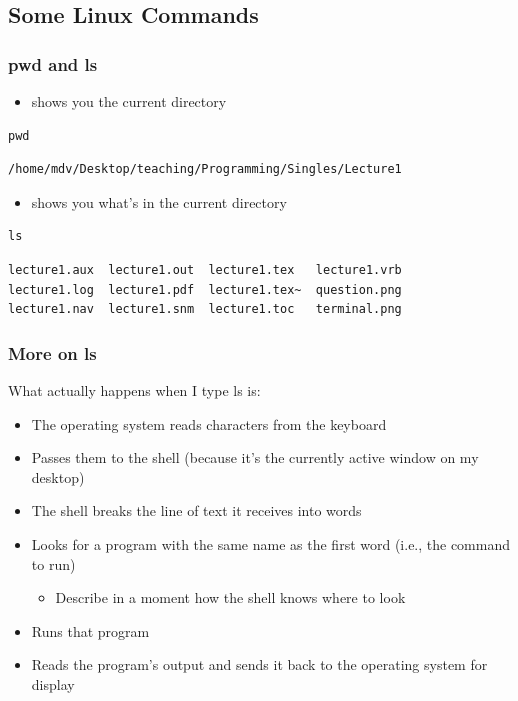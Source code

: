 \subsection{Some Linux Commands}

\begin{frame}[fragile]\frametitle{pwd and ls}
\begin{itemize}
\item {} shows you the current directory
\end{itemize}
\codelist
\begin{lstlisting}
pwd
\end{lstlisting}
\reslist
\begin{lstlisting}
/home/mdv/Desktop/teaching/Programming/Singles/Lecture1
\end{lstlisting}
\begin{itemize}
\item {} shows you what's in the current directory
\end{itemize}
\codelist
\begin{lstlisting}
ls
\end{lstlisting}
\reslist
\begin{lstlisting}
lecture1.aux  lecture1.out  lecture1.tex   lecture1.vrb
lecture1.log  lecture1.pdf  lecture1.tex~  question.png
lecture1.nav  lecture1.snm  lecture1.toc   terminal.png
\end{lstlisting}
\end{frame}

\begin{frame}[fragile]\frametitle{More on ls}
What actually happens when I type ls is:
\begin{itemize}
    \item The operating system reads characters from the keyboard
    \item Passes them to the shell (because it's the currently active window on my desktop)
    \item The shell breaks the line of text it receives into words
    \item Looks for a program with the same name as the first word (i.e., the command to run)
\begin{itemize}
          \item Describe in a moment how the shell knows where to look
\end{itemize}
    \item Runs that program
    \item Reads the program's output and sends it back to the operating system for display
\end{itemize}
\end{frame}

